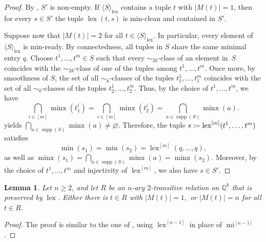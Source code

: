 \documentclass[a4paper,reqno, cleveref]{amsart}
\newcommand{\coloneqq}{\mathrel{\mathop:}\mathrel{\mkern-1.2mu}=}
\newtheorem{lemma}[theorem]{Lemma}
\newcommand{\Q}{\mathbb{Q}}
\newcommand{\br}[1]{[#1]}
\DeclareMathOperator{\supp}{supp}
\DeclareMathOperator{\mi}{mi}
\DeclareMathOperator{\lex}{lex}
\DeclareMathOperator{\minx}{minx}
\newcommand{\nested}[2]{{#1^{[#2]}}}
\newcommand{\genrel}[2]{\langle{#1}\rangle_{#2}}
\begin{document}
\begin{proof}
    By , $S'$ is non-empty. If $\genrel{S}{\lex}$ contains a tuple $t$ with $|M(t)|=1$, then for every $s\in S'$ the tuple $\lex(t,s)$ is min-clean and contained in $S'$. 
    
   Suppose now that $|M(t)|=2$ for all $t \in \genrel{S}{\lex}$. In particular, every element of $\genrel{S}{\lex}$ is min-ready.
    By connectedness, all tuples in $S$ share the same minimal entry $q$.
    Choose $t^1, \dots, t^m \in S$ such that every 
    $\sim_{2k}$-class  of an element in~$S$ coincides with the $\sim_{2k}$-class of one of the tuples among $t^1, \dots, t^m $.
    Once more, by smoothness of $S$, the set of all $\sim_{k}$-classes of the tuples $t^1_1, \dots, t^m_1 $ coincides with the set of all $\sim_{k}$-classes of the tuples $t^1_2, \dots, t^m_2$. 
    Thus, by the choice of $t^1, \dots, t^m $, we have 
    \[\bigcap_{i\in\br m}\minx(t_1^i)=\bigcap_{i\in\br m}\minx(t_2^i)=\bigcap_{a\in\supp( S)}\minx(a).\]
      yields $\bigcap_{a\in\supp( S)}\minx(a)\neq \varnothing$. 
    Therefore, the tuple $s\coloneqq\nested{\lex}{m}(t^1, \dots, t^m)$ 
    satisfies \[\min(s_1)=\min(s_2)=\nested{\lex}{m}(q,\dots,q),\] as well as $\minx(s_1)=\bigcap_{a\in\supp( S)}\minx(a)=\minx(s_2)$. Moreover, by the choice of $t^1, \dots, t^m $ and injectivity of $\nested{\lex}{m}$, we also have $s \in S'$.
\end{proof}

\begin{lemma}\label{l:minready}
    Let $n \geq 2$, and let $R$ be an $n$-ary  $2$-transitive relation on $\Q^k$ that is preserved by $\lex$. Either there is $t \in R$ with $|M(t)|=1,$ or $|M(t)|=n$ for all $t \in R$.
\end{lemma}%
\begin{proof}
    The proof is similar to the one of , using $\nested{\lex}{n-1}$ in place of $\nested{\mi}{n-1}$. 
\end{proof}
\end{document}

